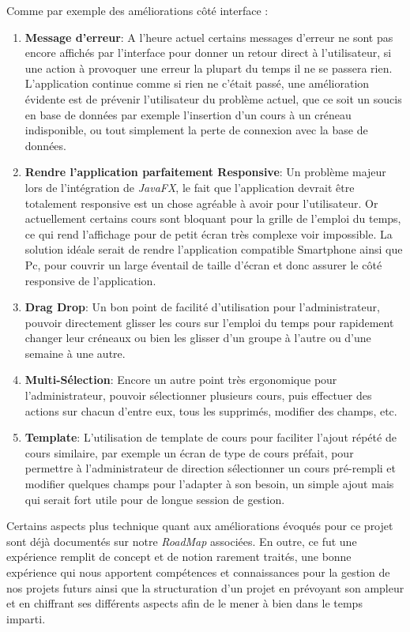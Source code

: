\documentclass[a4paper,french,final]{memoir}
\begin{document}
Comme par exemple des améliorations côté interface :
\begin{enumerate}
	\item \textbf{Message d'erreur}: A l'heure actuel certains messages d'erreur ne sont pas encore affichés par l'interface pour donner un retour direct à l'utilisateur, si une action à provoquer une erreur la plupart du temps il ne se passera rien. L'application continue comme si rien ne c'était passé, une amélioration évidente est de prévenir l'utilisateur du problème actuel, que ce soit un soucis en base de données par exemple l'insertion d'un cours à un créneau indisponible, ou tout simplement la perte de connexion avec la base de données.

	\item \textbf{Rendre l'application parfaitement Responsive}: Un problème majeur lors de l'intégration de \emph{JavaFX}, le fait que l'application devrait être totalement responsive est un chose agréable à avoir pour l'utilisateur. Or actuellement certains cours sont bloquant pour la grille de l'emploi du temps, ce qui rend l'affichage pour de petit écran très complexe voir impossible. La solution idéale serait de rendre l'application compatible Smartphone ainsi que Pc, pour couvrir un large éventail de taille d'écran et donc assurer le côté responsive de l'application.

    \item \textbf{Drag \And Drop}: Un bon point de facilité d'utilisation pour l'administrateur, pouvoir directement glisser les cours sur l'emploi du temps pour rapidement changer leur créneaux ou bien les glisser d'un groupe à l'autre ou d'une semaine à une autre.

    \item \textbf{Multi-Sélection}: Encore un autre point très ergonomique pour l'administrateur, pouvoir sélectionner plusieurs cours, puis effectuer des actions sur chacun d'entre eux, tous les supprimés, modifier des champs, etc.

    \item \textbf{Template}: L'utilisation de template de cours pour faciliter l'ajout répété de cours similaire, par exemple un écran de type de cours préfait, pour permettre à l'administrateur de direction sélectionner un cours pré-rempli et modifier quelques champs pour l'adapter à son besoin, un simple ajout mais qui serait fort utile pour de longue session de gestion.
\end{enumerate}

Certains aspects plus technique quant aux améliorations évoqués pour ce projet sont déjà documentés sur notre \emph{RoadMap} associées.
En outre, ce fut une expérience remplit de concept et de notion rarement traités, une bonne expérience qui nous apportent compétences et connaissances pour la gestion de nos projets futurs ainsi que la structuration d'un projet en prévoyant son ampleur et en chiffrant ses différents aspects afin de le mener à bien dans le temps imparti.

\appendixpage
\appendix

\backmatter
\listoffigures
{}
\end{document}
